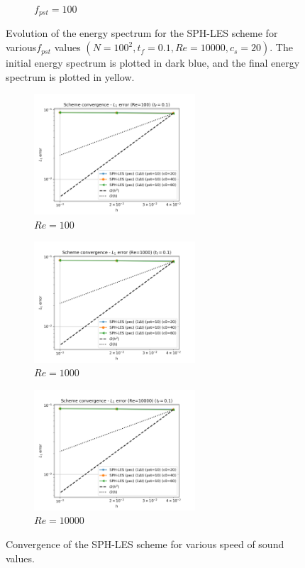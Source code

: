 \begin{figure}[htbp!]
\begin{subfigure}{7cm}
    \caption{$f_{pst} = 100$}
  \end{subfigure}
  \caption{Evolution of the energy spectrum for the SPH-LES scheme for various$f_{pst}$ values $(N=100^2, t_f=0.1, Re=10000, c_s=20)$. The initial energy spectrum is plotted in dark blue, and the final energy spectrum is plotted in yellow.}
  \label{fig:okra2022-pst-espec}
\end{figure}


\begin{figure}[htbp!]
  \begin{subfigure}{7cm}
    \centering\includegraphics[width=6cm]{Code-Figures/okra2022/c0/dt_pois_conv_c0_pec_re_100.png}
    \caption{$Re = 100$}
  \end{subfigure}
  \begin{subfigure}{7cm}
    \centering\includegraphics[width=6cm]{Code-Figures/okra2022/c0/dt_pois_conv_c0_pec_re_1000.png}
    \caption{$Re = 1000$}
  \end{subfigure}
  \begin{subfigure}{7cm}
    \centering\includegraphics[width=6cm]{Code-Figures/okra2022/c0/dt_pois_conv_c0_pec_re_10000.png}
    \caption{$Re = 10000$}
  \end{subfigure}
  \caption{Convergence of the SPH-LES scheme for various speed of sound values.}
  \label{fig:okra2022-c0}
\end{figure}

